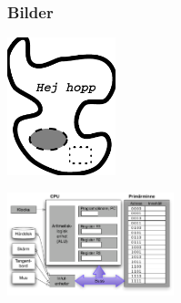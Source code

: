 \begin{frame}[fragile,t]
  \frametitle{Bilder}
  \vspace{2em}



  \blankline

  \vspace{2mm}
  \begin{exsrc}
\includegraphics[height=40mm]
    {images/bild.pdf}
  \end{exsrc}
  \begin{exresult}
\includegraphics[height=30mm]{images/enkelmodell.pdf}
  \end{exresult}

\end{frame}


